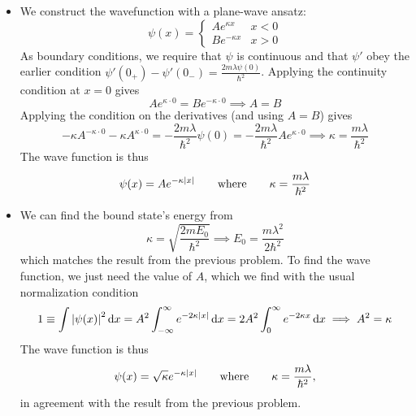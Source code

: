 \documentclass[11pt, a4paper]{article}
\newcommand{\diff}{\mathop{}\!\mathrm{d}} %
\newcommand{\eqtext}[1]{\qquad \text{#1} \qquad}
\begin{document}
\begin{itemize}
	
	\item We construct the wavefunction with a plane-wave ansatz:
	\begin{equation*}
		\psi(x) =
		\begin{cases}
			A e^{\kappa x} & x < 0\\
			B e^{-\kappa x} & x > 0
		\end{cases}
	\end{equation*}
	As boundary conditions, we require that $ \psi $ is continuous and that $ \psi' $ obey the earlier condition $ \psi'(0_{+}) - \psi'(0_{-}) = \frac{2m\lambda\psi(0)}{\hbar^{2}} $. Applying the continuity condition at $ x = 0 $ gives
	\begin{equation*}
		A e^{\kappa \cdot 0} = B e^{-\kappa \cdot 0} \implies A = B
	\end{equation*}
	Applying the condition on the derivatives (and using $ A = B $) gives
	\begin{equation*}
		-\kappa A^{-\kappa \cdot 0} -\kappa A^{\kappa \cdot 0} = -\frac{2m\lambda}{\hbar^{2}} \psi(0) = - \frac{2m\lambda }{\hbar^{2}} Ae^{\kappa \cdot  0} \implies \kappa = \frac{m\lambda}{\hbar^{2}}
	\end{equation*}
	The wave function is thus
	\begin{equation*}
		\psi(x) = A e^{-\kappa \abs{x}} \eqtext{where} \kappa = \frac{m\lambda}{\hbar^{2}}
	\end{equation*}

	
	\item We can find the bound state's energy from
	\begin{equation*}
		\kappa = \sqrt{\frac{2mE_{0}}{\hbar^{2}}} \implies E_{0} = \frac{m\lambda^{2}}{2\hbar^{2}}
	\end{equation*}
	which matches the result from the previous problem. To find the wave function, we just need the value of $ A $, which we find with the usual normalization condition
	\begin{equation*}
		1 \equiv \int \abs{\psi(x)}^{2} \diff x = A^{2} \int_{-\infty}^{\infty} e^{-2\kappa \abs{x}} \diff x = 2A^{2} \int_{0}^{\infty} e^{-2\kappa x} \diff x \implies A^{2} = \kappa
	\end{equation*}
	The wave function is thus
	\begin{equation*}
		\psi(x) = \sqrt{\kappa} e^{-\kappa \abs{x}} \eqtext{where} \kappa = \frac{m\lambda}{\hbar^{2}},
	\end{equation*}
	in agreement with the result from the previous problem. 
	 
\end{itemize}
\end{document}
